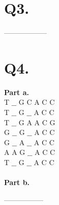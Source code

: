 \documentclass[a4paper,11pt]{article}
\begin{document}
\section*{Q3.}

\begin{center}
 ------------------
\end{center}
\section*{Q4.}
\textbf{Part a.}\\
T $\_\_$ G C A C C\\
T $\_\_$ G $\_\_$ A C C\\
T $\_\_$ G A A C G\\  
G $\_\_$ G $\_\_$ A C C\\
G $\_\_$ A $\_\_$ A C C\\
A A G $\_\_$ A C C\\
T $\_\_$ G $\_\_$ A C C\\
\\
\textbf{Part b.}\\
\begin{center}
-----------------\\
\end{center}
% 
% 
\end{document}
